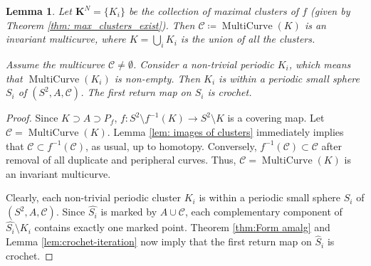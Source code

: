 \documentclass{amsart}
\theoremstyle{plain}
\newtheorem{lemma}[theorem]{Lemma}
\theoremstyle{definition}
\theoremstyle{remark}
\newcommand{\reminder}[1]{\textsl{$\lhd\rhd$#1$\lhd\rhd$}\marginpar{$\lhd\rhd\lhd\rhd\lhd\rhd$}}%
\newcommand{\hide}[1]{}
\newcommand{\CC}{{\mathcal C}}
\newcommand{\NL}{{\mathfrak N}}
\newcommand{\MC}{{\operatorname{MultiCurve}}}
\begin{document}







\begin{lemma}
\label{lem:iter step}
Let $\mathbf{K}^N=\{K_i\}$ be the collection of maximal clusters of $f$ (given by Theorem \ref{thm: max_clusters_exist}). 
Then $\CC\coloneq \MC(K)$ is an invariant multicurve, where $K=\bigcup_{i} K_i$ is the union of all the clusters.  

Assume the multicurve $\CC\not= \emptyset$. Consider a non-trivial periodic $K_i$, which means that $\MC(K_i)$ is non-empty. Then $K_i$ is within a periodic small sphere $S_i$ of $(S^2,A, \CC)$. The first return map on $\widehat{S_i}$ is crochet.

\end{lemma}
\begin{proof} Since $K\supset A\supset P_f$, $f\colon S^2\setminus f^{-1}(K)\to S^2\setminus K$ is a covering map.  Let $\CC=\MC(K)$.  Lemma \ref{lem: images of clusters} immediately implies that $\CC\subset f^{-1}(\CC)$, as usual, up to homotopy.  Conversely, $f^{-1}(\CC)\subset\CC$ after removal of all duplicate and peripheral curves.  Thus,  $\CC=\MC(K)$ is an invariant multicurve.

Clearly, each non-trivial periodic cluster $K_i$ is within a periodic small sphere $S_i$ of $(S^2,A, \CC)$. Since $\widehat{S_i}$ is marked by $A\cup \CC$, each complementary component of $\widehat{S_i}\setminus K_i$ contains exactly one marked point. Theorem \ref{thm:Form amalg} and Lemma \ref{lem:crochet-iteration} now imply that the first return map on $\widehat S_i$ is crochet.
\end{proof}
\end{document}
